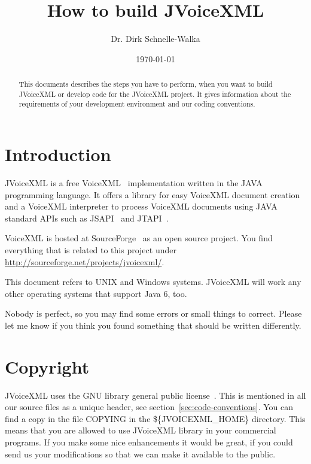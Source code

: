 \documentclass[11pt,a4paper]{article}
\title{How to build JVoiceXML}
\author{Dr. Dirk Schnelle-Walka}
\date{\today}
\begin{document}
\pagestyle{empty}

\maketitle

\pagestyle{headings}

\tableofcontents

\newpage

\begin{abstract}
This documents describes the steps you have to perform, when you want
to build JVoiceXML or develop code for the JVoiceXML project. It gives
information about the requirements of your development environment 
and our coding conventions.
\end{abstract}

\section{Introduction}
\label{sec:introduction}

JVoiceXML is a free VoiceXML~\cite{w3.org:voicexml} implementation written in 
the JAVA programming language. It offers a library for easy VoiceXML
document creation and a VoiceXML interpreter to process 
VoiceXML documents using JAVA standard APIs such as JSAPI~\cite{sun:jsapi} and
JTAPI~\cite{sun:jsapi}.

VoiceXML is hosted at SourceForge~\cite{sourceforge} as an open source project.
You find everything that is related to this project under
\url{http://sourceforge.net/projects/jvoicexml/}.

This document refers to UNIX and Windows systems. JVoiceXML will work 
any other operating systems that support Java 6, too.

Nobody is perfect, so you may find some errors or small things to correct.
Please let me know if you think you found something that should be written
differently.

\section{Copyright}
\label{sec:copyright}

JVoiceXML uses the GNU library general public license~\cite{gnu:lgpg}. 
This is mentioned in all our source files as a unique header, see
section~\ref{sec:code-conventions}.
You can find a copy in the file COPYING in the \$\{JVOICEXML\_HOME\}
directory. This means that you are allowed to use JVoiceXML
library in your commercial programs. If you make some nice
enhancements it would be great, if you could send us your
modifications so that we can make it available to the public.
\end{document}
